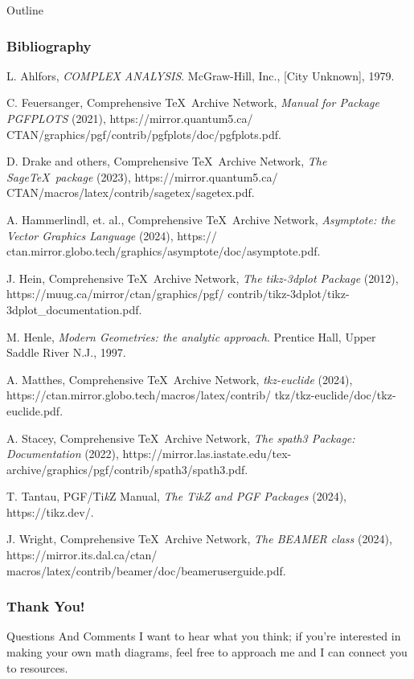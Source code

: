 \documentclass[24pt]{beamer}
\begin{document}
\begin{frame}[allowframebreaks]{Outline}
\frametitle{Bibliography}

\begin{thebibliography}{1}
L. Ahlfors, \emph{COMPLEX ANALYSIS}. McGraw-Hill, Inc., [City Unknown], 1979.

C. Feuersanger, Comprehensive \TeX\ Archive Network, \emph{Manual for Package PGFPLOTS} (2021), https://mirror.quantum5.ca/ CTAN/graphics/pgf/contrib/pgfplots/doc/pgfplots.pdf.

D. Drake and others, Comprehensive \TeX\ Archive Network, \emph{The Sage\TeX\ package} (2023), https://mirror.quantum5.ca/ CTAN/macros/latex/contrib/sagetex/sagetex.pdf.

A. Hammerlindl, et. al., Comprehensive \TeX\ Archive Network, \emph{Asymptote: the Vector Graphics Language} (2024), https:// ctan.mirror.globo.tech/graphics/asymptote/doc/asymptote.pdf.

J. Hein, Comprehensive \TeX\ Archive Network, \emph{The tikz-3dplot Package} (2012), https://muug.ca/mirror/ctan/graphics/pgf/ contrib/tikz-3dplot/tikz-3dplot\_documentation.pdf.

M. Henle, \emph{Modern Geometries: the analytic approach}. Prentice Hall, Upper Saddle River N.J., 1997.

A. Matthes, Comprehensive \TeX\ Archive Network, \emph{tkz-euclide} (2024), https://ctan.mirror.globo.tech/macros/latex/contrib/ tkz/tkz-euclide/doc/tkz-euclide.pdf.

A. Stacey, Comprehensive \TeX\ Archive Network, \emph{The spath3 Package: Documentation} (2022), https://mirror.las.iastate.edu/tex-archive/graphics/pgf/contrib/spath3/spath3.pdf.

T. Tantau, PGF/Ti\textit{k}Z Manual, \emph{The Ti\textit{k}Z and PGF Packages} (2024), https://tikz.dev/.

J. Wright, Comprehensive \TeX\ Archive Network, \emph{The BEAMER \textit{class}} (2024), https://mirror.its.dal.ca/ctan/ macros/latex/contrib/beamer/doc/beameruserguide.pdf.
\end{thebibliography}
\end{frame}

\begin{frame}
\frametitle{Thank You!}

\begin{block}{Questions And Comments}
I want to hear what you think; if you're interested in making your own math diagrams, feel free to approach me and I can connect you to resources.
\end{block}
\end{frame}
\end{document}
